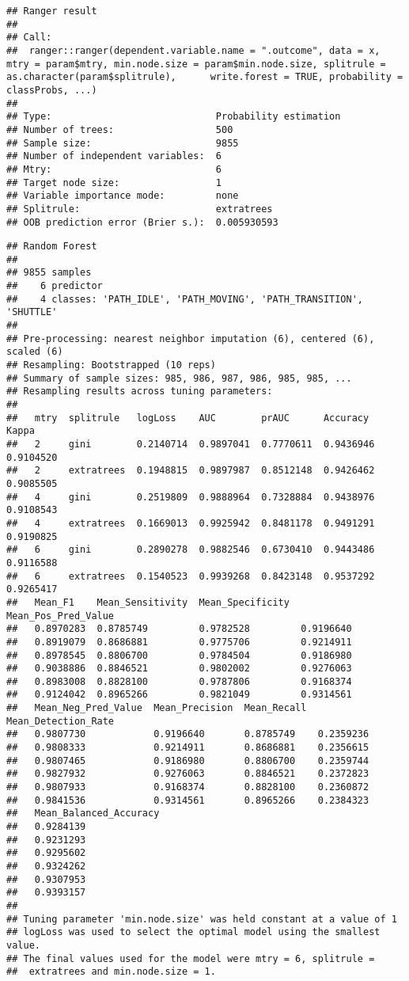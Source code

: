 \documentclass[]{article}
\begin{document}
\begin{verbatim}
## Ranger result
## 
## Call:
##  ranger::ranger(dependent.variable.name = ".outcome", data = x,      mtry = param$mtry, min.node.size = param$min.node.size, splitrule = as.character(param$splitrule),      write.forest = TRUE, probability = classProbs, ...) 
## 
## Type:                             Probability estimation 
## Number of trees:                  500 
## Sample size:                      9855 
## Number of independent variables:  6 
## Mtry:                             6 
## Target node size:                 1 
## Variable importance mode:         none 
## Splitrule:                        extratrees 
## OOB prediction error (Brier s.):  0.005930593
\end{verbatim}

\begin{verbatim}
## Random Forest 
## 
## 9855 samples
##    6 predictor
##    4 classes: 'PATH_IDLE', 'PATH_MOVING', 'PATH_TRANSITION', 'SHUTTLE' 
## 
## Pre-processing: nearest neighbor imputation (6), centered (6), scaled (6) 
## Resampling: Bootstrapped (10 reps) 
## Summary of sample sizes: 985, 986, 987, 986, 985, 985, ... 
## Resampling results across tuning parameters:
## 
##   mtry  splitrule   logLoss    AUC        prAUC      Accuracy   Kappa    
##   2     gini        0.2140714  0.9897041  0.7770611  0.9436946  0.9104520
##   2     extratrees  0.1948815  0.9897987  0.8512148  0.9426462  0.9085505
##   4     gini        0.2519809  0.9888964  0.7328884  0.9438976  0.9108543
##   4     extratrees  0.1669013  0.9925942  0.8481178  0.9491291  0.9190825
##   6     gini        0.2890278  0.9882546  0.6730410  0.9443486  0.9116588
##   6     extratrees  0.1540523  0.9939268  0.8423148  0.9537292  0.9265417
##   Mean_F1    Mean_Sensitivity  Mean_Specificity  Mean_Pos_Pred_Value
##   0.8970283  0.8785749         0.9782528         0.9196640          
##   0.8919079  0.8686881         0.9775706         0.9214911          
##   0.8978545  0.8806700         0.9784504         0.9186980          
##   0.9038886  0.8846521         0.9802002         0.9276063          
##   0.8983008  0.8828100         0.9787806         0.9168374          
##   0.9124042  0.8965266         0.9821049         0.9314561          
##   Mean_Neg_Pred_Value  Mean_Precision  Mean_Recall  Mean_Detection_Rate
##   0.9807730            0.9196640       0.8785749    0.2359236          
##   0.9808333            0.9214911       0.8686881    0.2356615          
##   0.9807465            0.9186980       0.8806700    0.2359744          
##   0.9827932            0.9276063       0.8846521    0.2372823          
##   0.9807933            0.9168374       0.8828100    0.2360872          
##   0.9841536            0.9314561       0.8965266    0.2384323          
##   Mean_Balanced_Accuracy
##   0.9284139             
##   0.9231293             
##   0.9295602             
##   0.9324262             
##   0.9307953             
##   0.9393157             
## 
## Tuning parameter 'min.node.size' was held constant at a value of 1
## logLoss was used to select the optimal model using the smallest value.
## The final values used for the model were mtry = 6, splitrule =
##  extratrees and min.node.size = 1.
\end{verbatim}
\end{document}
